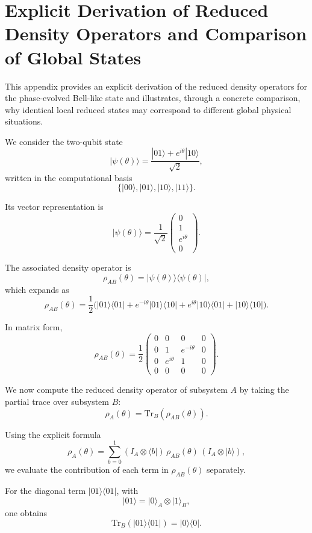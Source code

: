 \documentclass[a4paper]{article}
\begin{document}
\appendix
\section{Explicit Derivation of Reduced Density Operators and Comparison of Global States}

This appendix provides an explicit derivation of the reduced density operators for the phase-evolved Bell-like state and illustrates, through a concrete comparison, why identical local reduced states may correspond to different global physical situations.

We consider the two-qubit state
\[
|\psi(\theta)\rangle = \frac{|01\rangle + e^{i\theta}|10\rangle}{\sqrt{2}},
\]
written in the computational basis
\[
\{|00\rangle, |01\rangle, |10\rangle, |11\rangle\}.
\]

Its vector representation is
\[
|\psi(\theta)\rangle =
\frac{1}{\sqrt{2}}
\begin{pmatrix}
0 \\
1 \\
e^{i\theta} \\
0
\end{pmatrix}.
\]

The associated density operator is
\[
\rho_{AB}(\theta) = |\psi(\theta)\rangle\langle\psi(\theta)|,
\]
which expands as
\[
\rho_{AB}(\theta)
=
\frac{1}{2}
\Big(
|01\rangle\langle 01|
+
e^{-i\theta}|01\rangle\langle 10|
+
e^{i\theta}|10\rangle\langle 01|
+
|10\rangle\langle 10|
\Big).
\]

In matrix form,
\[
\rho_{AB}(\theta)
=
\frac{1}{2}
\begin{pmatrix}
0 & 0 & 0 & 0 \\
0 & 1 & e^{-i\theta} & 0 \\
0 & e^{i\theta} & 1 & 0 \\
0 & 0 & 0 & 0
\end{pmatrix}.
\]

We now compute the reduced density operator of subsystem $A$ by taking the partial trace over subsystem $B$:
\[
\rho_A(\theta) = \mathrm{Tr}_B(\rho_{AB}(\theta)).
\]

Using the explicit formula
\[
\rho_A(\theta)
=
\sum_{b=0}^{1}
(I_A \otimes \langle b|)\,\rho_{AB}(\theta)\,(I_A \otimes |b\rangle),
\]
we evaluate the contribution of each term in $\rho_{AB}(\theta)$ separately.

For the diagonal term $|01\rangle\langle 01|$, with
\[
|01\rangle = |0\rangle_A \otimes |1\rangle_B,
\]
one obtains
\[
\mathrm{Tr}_B(|01\rangle\langle 01|) = |0\rangle\langle 0|.
\]
\end{document}
